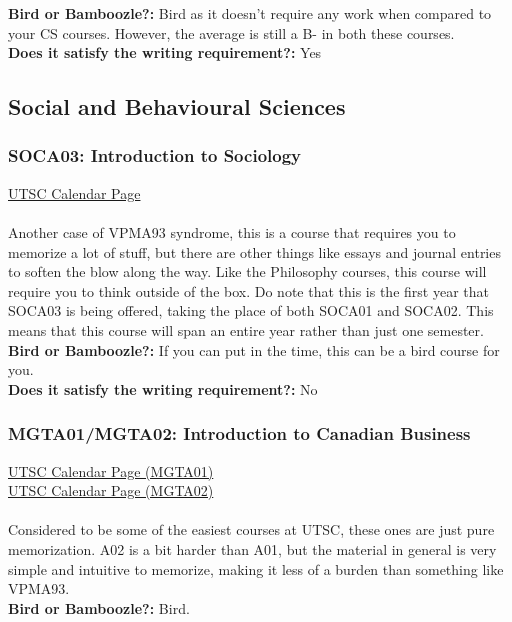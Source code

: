 \documentclass[11pt]{article}
\begin{document}
\textbf{Bird or Bamboozle?:} Bird as it doesn't require any work when compared to your CS courses. However, the average is still a B- in both these courses.\\

\textbf{Does it satisfy the writing requirement?:} Yes

\subsection{Social and Behavioural Sciences}
\subsubsection{SOCA03: Introduction to Sociology}
\href{https://utsc.calendar.utoronto.ca/course/soca03y3}{UTSC Calendar Page}\\\\
Another case of VPMA93 syndrome, this is a course that requires you to memorize a lot of stuff, but there are other things like essays and journal entries to soften the blow along the way.  Like the Philosophy courses, this course will require you to think outside of the box. Do note that this is the first year that SOCA03 is being offered, taking the place of both SOCA01 and SOCA02.  This means that this course will span an entire year rather than just one semester.\\

\textbf{Bird or Bamboozle?:}  If you can put in the time, this can be a bird course for you.\\

\textbf{Does it satisfy the writing requirement?:} No

\subsubsection{MGTA01/MGTA02: Introduction to Canadian Business}
\href{https://utsc.calendar.utoronto.ca/course/MGTA01H3}{UTSC Calendar Page (MGTA01)}\\
\href{https://utsc.calendar.utoronto.ca/course/MGTA02H3}{UTSC Calendar Page (MGTA02)}\\\\
Considered to be some of the easiest courses at UTSC, these ones are just pure memorization.  A02 is a bit harder than A01, but the material in general is very simple and intuitive to memorize, making it less of a burden than something like VPMA93.\\

\textbf{Bird or Bamboozle?:} Bird.\\
\end{document}
